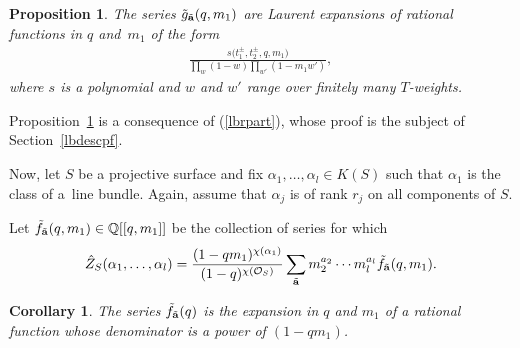 \documentclass[10pt,a4paper]{amsart}
\newtheorem{Corollary}[Theorem]{Corollary}
\newtheorem{Proposition}[Theorem]{Proposition}
 { \theoremstyle{definition}
\newtheorem{Definition}[Theorem]{Definition}
\newtheorem{Note}[Theorem]{Note}
\newtheorem{Example}[Theorem]{Example}
\newtheorem{Remark}[Theorem]{Remark} }
\numberwithin{equation}{section}
\def\Q{\mathbb Q}
\begin{document}
\begin{Proposition}\label{lbequivdesc}
The series $\tilde{g}_{\tilde{\bf a}}(q,m_1)$ are Laurent expansions of rational functions in $q$ and~$m_1$ of the form
\begin{gather*}
\frac{s\big(t_1^{\pm}, t_2^{\pm},q,m_1\big)}{\prod_{w}(1-w)\prod_{w'}(1-m_1w')},
\end{gather*}
where $s$ is a polynomial and $w$ and $w'$ range over finitely many $T$-weights.
\end{Proposition}

Proposition~\ref{lbequivdesc} is a consequence of (\ref{lbrpart}), whose proof is the subject of Section~\ref{lbdescpf}.

Now, let $S$ be a projective surface and fix $\alpha_1,\dots,\alpha_l\in K(S)$ such that $\alpha_1$ is the class of a~line bundle. Again, assume that $\alpha_j$ is of rank $r_j$ on all components of $S$.

Let $\tilde{f}_{\tilde{\bf{a}}}(q,m_1)\in \Q[[q,m_1]]$ be the collection of series for which
\begin{gather*}
\hat{Z}_S(\alpha_1,\dots,\alpha_l)=\frac{(1-qm_1)^{\chi(\alpha_1)}} {(1-q)^{\chi(\mathcal{O}_S)}}\sum_{\tilde{\bf{a}}} m_2^{a_2}\cdots m_l^{a_l}\tilde{f}_{\tilde{\bf{a}}}(q,m_1).
\end{gather*}

\begin{Corollary}
The series $\tilde{f}_{\tilde{\bf a}}(q)$ is the expansion in $q$ and $m_1$ of a rational function whose denominator is a power of $(1-qm_1)$.
\end{Corollary}
\end{document}

